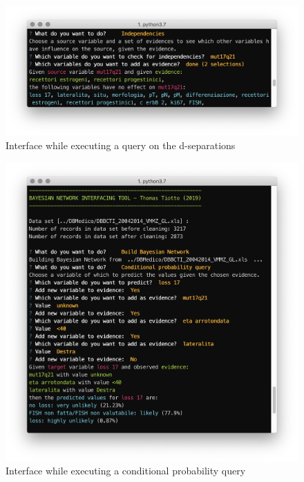 \begin{figure}[htbp]
\centerline{\includegraphics[width=\columnwidth]{methodology/images/nl-independencies-query}}
\caption{Interface while executing a query on the d-separations}
\label{fig:nl-independencies}
\end{figure}

\begin{figure}[htbp]
\centerline{\includegraphics[width=\columnwidth]{methodology/images/nl-conditional-query}}
\caption{Interface while executing a conditional probability query}
\label{fig:nl-conditional}
\end{figure}

